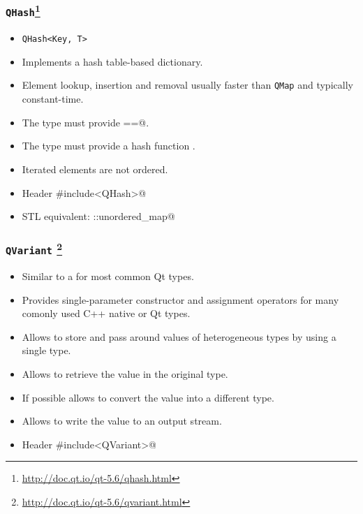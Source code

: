 \begin{frame}[fragile]
  \frametitle{\texttt{QHash}\footnote
    {\url{http://doc.qt.io/qt-5.6/qhash.html}}}
  \begin{itemize}
    \item \texttt{QHash<Key, T>}
    \item Implements a hash table-based dictionary.
    \item Element lookup, insertion and removal usually faster than \texttt{QMap}
    and typically constant-time.
    \item The \verb@Key@ type must provide \verb@operator ==@.
    \item The \verb@Key@ type must provide a hash function \verb@qHash@.
    \item Iterated elements are not ordered.
    \item Header \verb@#include<QHash>@
    \item STL equivalent: \verb@std::unordered_map@
  \end{itemize}
\end{frame}

\begin{frame}[fragile]
  \frametitle{\texttt{QVariant}
    \footnote{\url{http://doc.qt.io/qt-5.6/qvariant.html}}}
  \begin{itemize}
    \item Similar to a  \verb@union@ for most common Qt types.
    \item Provides single-parameter constructor and assignment operators
      for many comonly used C++ native or Qt types.
    \item Allows to store and pass around values of heterogeneous types by
      using a single type.
    \item Allows to retrieve the value in the original type.
    \item If possible allows to convert the value into a different type.
    \item Allows to write the value to an output stream.
    \item Header \verb@#include<QVariant>@
  \end{itemize}
\end{frame}

